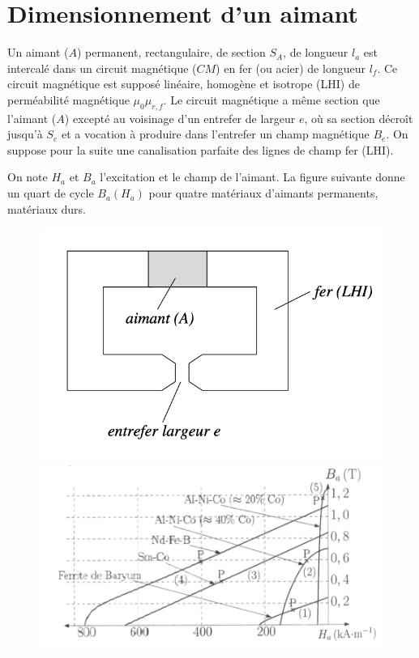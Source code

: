 \documentclass{report}
\begin{document}
\newpage

\section*{Dimensionnement d'un aimant}

Un aimant ($A$) permanent, rectangulaire, de section $S_A$, de longueur $l_a$ est intercalé dans un circuit magnétique ($CM$) en fer (ou acier) de longueur $l_f$. Ce circuit magnétique est supposé linéaire, homogène et isotrope (LHI) de perméabilité magnétique $\mu_0\mu_{r,f}$. Le circuit magnétique a même section que l’aimant ($A$) excepté au voisinage d’un entrefer de largeur $e$, où sa section décroît jusqu’à $S_e$ et a vocation à produire dans l’entrefer un champ magnétique $B_e$. On suppose pour la suite une canalisation parfaite des lignes de champ fer (LHI).

On note $H_a$ et $B_a$ l’excitation et le champ de l’aimant. La figure suivante donne un quart de cycle $B_a(H_a)$ pour quatre matériaux d’aimants permanents, matériaux durs.

\begin{figure}[h!]
   \begin{minipage}[c]{.4\linewidth}
      \includegraphics[scale=0.55]{entrefer.png}
   \end{minipage} \hfill
   \begin{minipage}[c]{.5\linewidth}
      \includegraphics[scale=0.5]{caracteristique_ferro.png}
   \end{minipage}
\end{figure}
\end{document}
